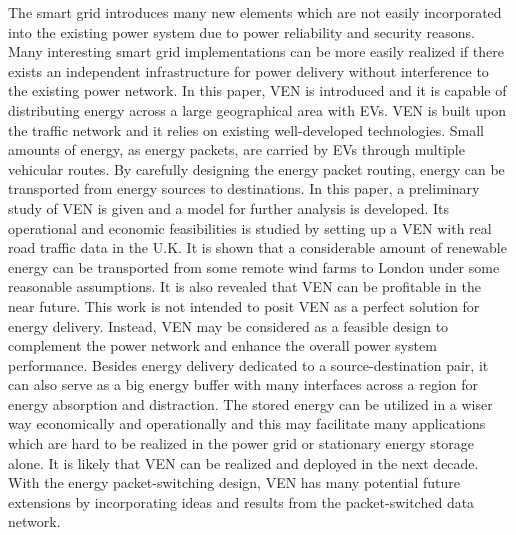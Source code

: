 \documentclass[journal]{IEEEtran}
\begin{document}
The smart grid introduces many new elements which are not easily  incorporated into the existing power system due to power reliability and security reasons. Many interesting smart grid implementations  can be more easily realized  if there exists an independent infrastructure for power delivery without interference to the existing power network. In this paper, VEN is introduced and it is capable of distributing energy across a large geographical area with EVs. VEN is built upon the traffic network and it relies on existing well-developed technologies. Small amounts of energy, as energy packets, are carried by EVs through multiple vehicular routes. By carefully designing the energy packet routing, energy can be transported from energy sources to destinations. In this paper, a preliminary study of VEN is given and a model for further analysis is developed. Its operational and economic feasibilities is studied by setting up a VEN with real road traffic data in the U.K. It is shown that a considerable amount of renewable energy can be transported from some remote wind farms to London under some reasonable assumptions. It is also revealed that VEN can be profitable in the near future. This work is not intended to posit VEN as a perfect solution for energy delivery. Instead, VEN may be considered as a feasible design to complement the power network and enhance the overall power system performance.  Besides energy delivery dedicated to a source-destination pair, it can also serve as a big energy buffer with many interfaces across a region for energy absorption and distraction. The stored energy can be utilized in a wiser way economically and operationally and this may facilitate many applications which are hard to be realized in the power grid or stationary energy storage alone. It is likely that VEN can be realized and deployed in the next decade. With the energy packet-switching design, VEN has many potential future extensions by incorporating ideas and results from the packet-switched data network.






\ifCLASSOPTIONcaptionsoff
  \newpage
\fi
\end{document}
